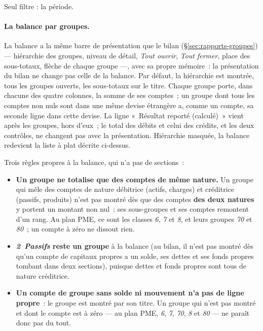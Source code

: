 \documentclass[a4paper,11pt,oneside]{article}
\begin{document}
Seul filtre : la période.

\paragraph{La balance par groupes.} La balance a la même barre de présentation que le bilan
(\S\ref{sec:rapports-groupes}) --- hiérarchie des groupes, niveau de détail, \emph{Tout ouvrir},
\emph{Tout fermer}, place des sous-totaux, flèche de chaque groupe ---, avec sa propre mémoire~:
la présentation du bilan ne change pas celle de la balance. Par défaut, la hiérarchie est montrée,
tous les groupes ouverts, les sous-totaux sur le titre. Chaque groupe porte, dans chacune des quatre
colonnes, la somme de ses comptes~; un groupe dont tous les comptes non nuls sont dans une même
devise étrangère a, comme un compte, sa seconde ligne dans cette devise. La ligne
«~Résultat reporté (calculé)~» vient après les groupes, hors d'eux~; le total des débits et celui
des crédits, et les deux contrôles, ne changent pas avec la présentation. Hiérarchie masquée, la
balance redevient la liste à plat décrite ci-dessus.

Trois règles propres à la balance, qui n'a pas de sections~:
\begin{itemize}
    \item \textbf{Un groupe ne totalise que des comptes de même nature.} Un groupe qui mêle des
          comptes de nature débitrice (actifs, charges) et créditrice (passifs, produits) n'est pas
          montré dès que des comptes \textbf{des deux natures} y portent un montant non nul~: ses
          sous-groupes et ses comptes remontent d'un rang. Au plan PME, ce sont les classes
          \emph{6}, \emph{7} et \emph{8}, et leurs groupes \emph{70} et \emph{80}~; un compte à
          zéro ne dissout rien.
    \item \textbf{\emph{2~Passifs} reste un groupe} à la balance (au bilan, il n'est pas montré dès
          qu'un compte de capitaux propres a un solde, ses dettes et ses fonds propres tombant dans deux
          sections), puisque dettes et fonds propres sont tous
          de nature créditrice.
    \item \textbf{Un compte de groupe sans solde ni mouvement n'a pas de ligne propre}~: le groupe
          est montré par son titre. Un groupe qui n'est pas montré et dont le compte est à zéro
          --- au plan PME, \emph{6}, \emph{7}, \emph{70}, \emph{8} et \emph{80} --- ne paraît donc
          pas du tout.
\end{itemize}
\end{document}
